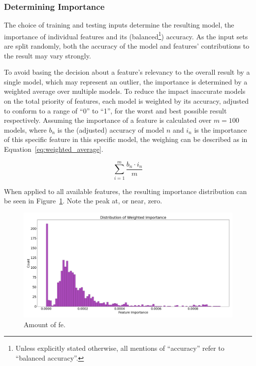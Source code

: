 \subsubsection{Determining Importance}

The choice of training and testing inputs determine the resulting model, the 
importance of individual features and its (balanced\footnote{Unless explicitly
stated otherwise, all mentions of \enquote{accuracy} refer to \enquote{balanced
accuracy}.}) accuracy. As the input sets are split randomly, both the accuracy
of the model and features' contributions to the result may vary strongly.

To avoid basing the decision about a feature's relevancy to the overall result
by a single model, which may represent an outlier, the importance is determined
by a weighted average over multiple models. To reduce the impact inaccurate 
models on the total priority of features, each model is weighted by its 
accuracy, adjusted to conform to a range of \enquote{0} to \enquote{1}, for 
the worst and best possible result respectively. Assuming the importance of 
a feature is calculated over \(m = 100\) models, where \( b_n \) is the 
(adjusted) accuracy of model \(n\) and \(i_n\) is the importance of this 
specific feature in this specific model, the weighing can be described as in
Equation~\ref{eq:weighted_average}.

\begin{equation} \label{eq:weighted_average}
    \sum_{i=1}^{m} \frac{b_n \cdot i_n}{m}
\end{equation}

When applied to all available features, the resulting importance distribution
can be seen in Figure~\ref{fig:importance_dist}. Note the peak at, or near, 
zero.

\begin{figure}[H]
    \centering
    \includegraphics[width=\textwidth]{img/feature_importance_dist.png}
    \caption{Amount of fe.}\label{fig:importance_dist}
\end{figure}

